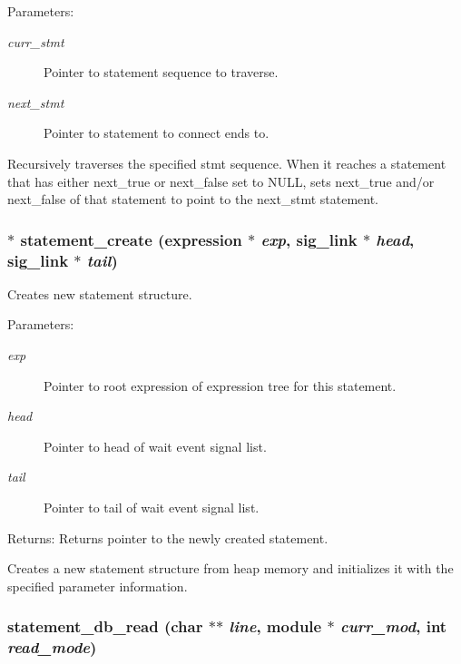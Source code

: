\begin{Desc}
\item[Parameters:]
\begin{description}
\item[{\em curr\_\-stmt}]Pointer to statement sequence to traverse. \item[{\em next\_\-stmt}]Pointer to statement to connect ends to.\end{description}
\end{Desc}
Recursively traverses the specified stmt sequence. When it reaches a statement that has either next\_\-true or next\_\-false set to NULL, sets next\_\-true and/or next\_\-false of that statement to point to the next\_\-stmt statement. 
\subsubsection{$\ast$ statement\_\-create ({\bf expression} $\ast$ {\em exp}, {\bf sig\_\-link} $\ast$ {\em head}, {\bf sig\_\-link} $\ast$ {\em tail})}\label{statement_8h_a0}


Creates new statement structure. 

\begin{Desc}
\item[Parameters:]
\begin{description}
\item[{\em exp}]Pointer to root expression of expression tree for this statement. \item[{\em head}]Pointer to head of wait event signal list. \item[{\em tail}]Pointer to tail of wait event signal list.\end{description}
\end{Desc}
\begin{Desc}
\item[Returns:]Returns pointer to the newly created statement.\end{Desc}
Creates a new statement structure from heap memory and initializes it with the specified parameter information. 
\subsubsection{ statement\_\-db\_\-read (char $\ast$$\ast$ {\em line}, {\bf module} $\ast$ {\em curr\_\-mod}, int {\em read\_\-mode})}\label{statement_8h_a2}


